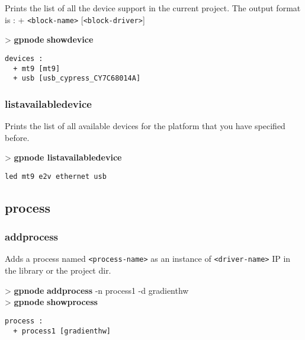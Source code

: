 \documentclass[10pt,a4paper]{article}
\begin{document}
Prints the list of all the device support in the current project. The output format is : + \texttt{<block-name>} [\texttt{<block-driver>}]

\begin{sampletitle}
> \textbf{gpnode} \textbf{showdevice}
\begin{Verbatim}
devices :
  + mt9 [mt9]
  + usb [usb_cypress_CY7C68014A]
\end{Verbatim}
\end{sampletitle}

\subsubsection{listavailabledevice}

Prints the list of all available devices for the platform that you have specified before.

\begin{sampletitle}
> \textbf{gpnode listavailabledevice}
\begin{Verbatim}
led mt9 e2v ethernet usb
\end{Verbatim}
\end{sampletitle}

\subsection{process}
\subsubsection{addprocess}

Adds a process named \texttt{<process-name>} as an instance of \texttt{<driver-name>} IP in the library or the project dir.\\


\begin{sampletitle}
> \textbf{gpnode} \textbf{addprocess} -n process1 -d gradienthw\\
> \textbf{gpnode} \textbf{showprocess}
\begin{Verbatim}
process :
  + process1 [gradienthw]
\end{Verbatim}
\end{sampletitle}
\end{document}
